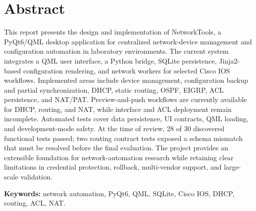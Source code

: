 \chapter*{Abstract}

This report presents the design and implementation of NetworkTools, a PyQt6/QML desktop application for centralized network-device management and configuration automation in laboratory environments. The current system integrates a QML user interface, a Python bridge, SQLite persistence, Jinja2-based configuration rendering, and network workers for selected Cisco IOS workflows. Implemented areas include device management, configuration backup and partial synchronization, DHCP, static routing, OSPF, EIGRP, ACL persistence, and NAT/PAT. Preview-and-push workflows are currently available for DHCP, routing, and NAT, while interface and ACL deployment remain incomplete. Automated tests cover data persistence, UI contracts, QML loading, and development-mode safety. At the time of review, 28 of 30 discovered functional tests passed; two routing contract tests exposed a schema mismatch that must be resolved before the final evaluation. The project provides an extensible foundation for network-automation research while retaining clear limitations in credential protection, rollback, multi-vendor support, and large-scale validation.

\textbf{Keywords:} network automation, PyQt6, QML, SQLite, Cisco IOS, DHCP, routing, ACL, NAT.
